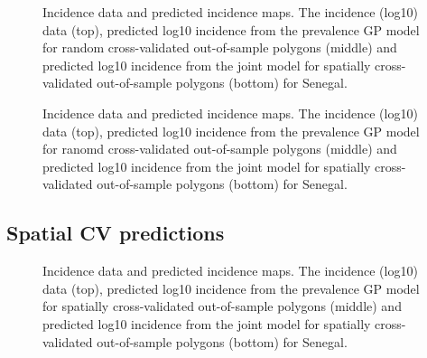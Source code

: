\documentclass[10pt,a4]{article}
\begin{document}
\begin{figure}[h!]
\caption{\label{predobsmapsen}
Incidence data and predicted incidence maps.
The incidence (log10) data (top), predicted log10 incidence from the prevalence GP model for random cross-validated out-of-sample polygons (middle) and predicted log10 incidence from the joint model for spatially cross-validated out-of-sample polygons (bottom) for Senegal.
}
\end{figure}



\begin{figure}[h!]
\caption{\label{predobsmapsen}
Incidence data and predicted incidence maps.
The incidence (log10) data (top), predicted log10 incidence from the prevalence GP model for ranomd cross-validated out-of-sample polygons (middle) and predicted log10 incidence from the joint model for spatially cross-validated out-of-sample polygons (bottom) for Senegal.
}
\end{figure}


\clearpage
\subsection{Spatial CV predictions}


\begin{figure}[h!]
\caption{\label{predobsmapsen}
Incidence data and predicted incidence maps.
The incidence (log10) data (top), predicted log10 incidence from the prevalence GP model for spatially cross-validated out-of-sample polygons (middle) and predicted log10 incidence from the joint model for spatially cross-validated out-of-sample polygons (bottom) for Senegal.
}
\end{figure}
\end{document}
